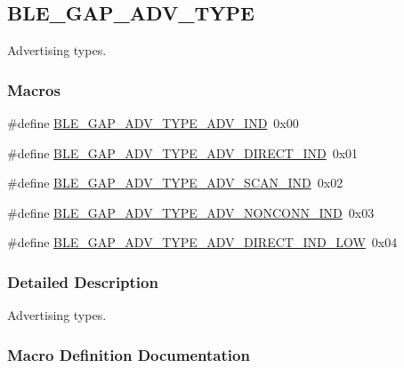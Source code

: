 \hypertarget{group___b_l_e___g_a_p___a_d_v___t_y_p_e}{}\subsection{B\+L\+E\+\_\+\+G\+A\+P\+\_\+\+A\+D\+V\+\_\+\+T\+Y\+PE}
\label{group___b_l_e___g_a_p___a_d_v___t_y_p_e}


Advertising types.  


\subsubsection*{Macros}
\begin{DoxyCompactItemize}
\item 
\#define \hyperlink{group___b_l_e___g_a_p___a_d_v___t_y_p_e_ga6cc0db53453977ee0a31e59f07de2b86}{B\+L\+E\+\_\+\+G\+A\+P\+\_\+\+A\+D\+V\+\_\+\+T\+Y\+P\+E\+\_\+\+A\+D\+V\+\_\+\+I\+ND}~0x00
\item 
\#define \hyperlink{group___b_l_e___g_a_p___a_d_v___t_y_p_e_gafefde83f6b598e7fb14868e0610bdf43}{B\+L\+E\+\_\+\+G\+A\+P\+\_\+\+A\+D\+V\+\_\+\+T\+Y\+P\+E\+\_\+\+A\+D\+V\+\_\+\+D\+I\+R\+E\+C\+T\+\_\+\+I\+ND}~0x01
\item 
\#define \hyperlink{group___b_l_e___g_a_p___a_d_v___t_y_p_e_ga594ca8490efef1702e8ccb6a28d2a1de}{B\+L\+E\+\_\+\+G\+A\+P\+\_\+\+A\+D\+V\+\_\+\+T\+Y\+P\+E\+\_\+\+A\+D\+V\+\_\+\+S\+C\+A\+N\+\_\+\+I\+ND}~0x02
\item 
\#define \hyperlink{group___b_l_e___g_a_p___a_d_v___t_y_p_e_ga8c86ca45ebffc3938fd97f9556daa49c}{B\+L\+E\+\_\+\+G\+A\+P\+\_\+\+A\+D\+V\+\_\+\+T\+Y\+P\+E\+\_\+\+A\+D\+V\+\_\+\+N\+O\+N\+C\+O\+N\+N\+\_\+\+I\+ND}~0x03
\item 
\#define \hyperlink{group___b_l_e___g_a_p___a_d_v___t_y_p_e_gac83afe118043fbeb38647a56eb65f31e}{B\+L\+E\+\_\+\+G\+A\+P\+\_\+\+A\+D\+V\+\_\+\+T\+Y\+P\+E\+\_\+\+A\+D\+V\+\_\+\+D\+I\+R\+E\+C\+T\+\_\+\+I\+N\+D\+\_\+\+L\+OW}~0x04
\end{DoxyCompactItemize}


\subsubsection{Detailed Description}
Advertising types. 



\subsubsection{Macro Definition Documentation}
